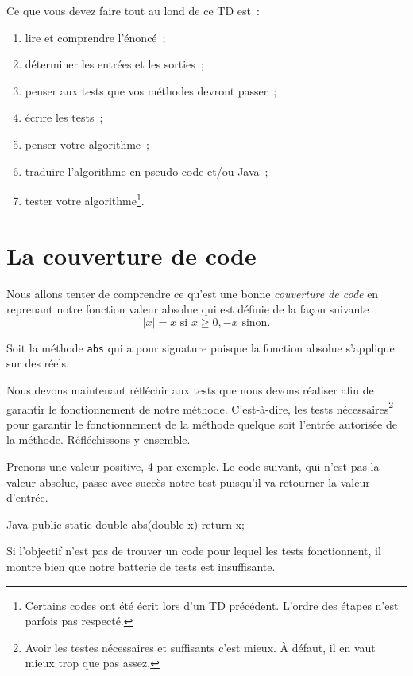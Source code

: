 \documentclass[a4paper,11pt]{article}
\begin{document}
	Ce que vous devez faire tout au lond de ce TD est~:
	\begin{enumerate}
		\item lire et comprendre l'énoncé~;
		\item déterminer les entrées et les sorties~;
		\item penser aux tests que vos méthodes devront passer~;
		\item écrire les tests~;
		\item penser votre algorithme~;
		\item traduire l'algorithme en pseudo-code et/ou Java~;
		\item tester votre algorithme\footnote{Certains codes ont été écrit lors d'un TD précédent. L'ordre des étapes n'est parfois pas respecté.}.
	\end{enumerate}


\section{La couverture de code}

	Nous allons tenter de comprendre ce qu'est une bonne \emph{couverture de code} en reprenant notre fonction valeur absolue qui est définie de la façon suivante~:
	$$
		|x| = x \textrm{ si } x \geq 0, -x \textrm{ sinon}.
	$$

	Soit la méthode \texttt{abs} qui a pour signature  puisque la fonction absolue s'applique sur des réels.

	Nous devons maintenant réfléchir aux tests que nous devons réaliser afin de garantir le fonctionnement de notre méthode. C'est-à-dire, les tests nécessaires\footnote{Avoir les testes nécessaires et suffisants c'est mieux. À défaut, il en vaut mieux trop que pas assez.} pour garantir le fonctionnement de la méthode quelque soit l'entrée autorisée de la méthode. Réfléchissons-y ensemble.

	Prenons une valeur positive, 4 par exemple. Le code suivant, qui n'est pas la valeur absolue, passe avec succès notre test puisqu'il va retourner la valeur d'entrée.
	\begin{Code}{Java}
		public static double abs(double x) {
			return x;
		}
	\end{Code}


	Si l'objectif n'est pas de trouver un code pour lequel les tests fonctionnent, il montre bien que notre batterie de tests est insuffisante.
\end{document}
